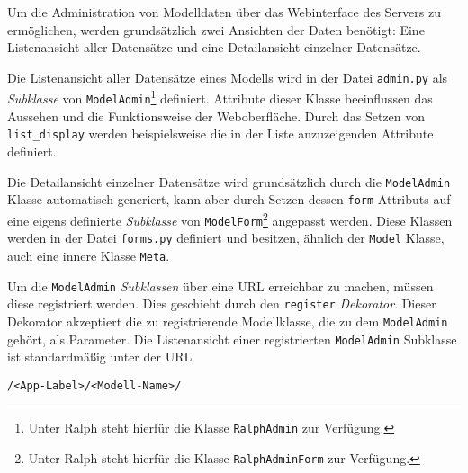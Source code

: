 Um die Administration von Modelldaten über das Webinterface des Servers
zu ermöglichen, werden grundsätzlich zwei Ansichten der Daten benötigt:
Eine Listenansicht aller Datensätze und eine Detailansicht einzelner
Datensätze.

Die Listenansicht aller Datensätze eines Modells wird in der Datei
\texttt{admin.py} als
\emph{Subklasse}
von \texttt{ModelAdmin}\footnote{Unter Ralph steht hierfür die Klasse
  \texttt{RalphAdmin} zur Verfügung.\cite{ralph-admin-doku}} definiert.
Attribute dieser Klasse beeinflussen das Aussehen und die Funktionsweise
der Weboberfläche. Durch das Setzen von \texttt{list\_display} werden
beispielsweise die in der Liste anzuzeigenden Attribute definiert.

Die Detailansicht einzelner Datensätze wird grundsätzlich durch die
\texttt{ModelAdmin} Klasse automatisch generiert, kann aber durch Setzen
dessen \texttt{form} Attributs auf eine eigens definierte
\emph{Subklasse}
von \texttt{ModelForm}\footnote{Unter Ralph steht hierfür die Klasse
  \texttt{RalphAdminForm} zur Verfügung.} angepasst werden. Diese
Klassen werden in der Datei \texttt{forms.py} definiert und besitzen,
ähnlich der \texttt{Model} Klasse, auch eine innere Klasse
\texttt{Meta}.

Um die \texttt{ModelAdmin}
\emph{Subklassen}
über eine URL erreichbar zu machen, müssen diese registriert werden.
Dies geschieht durch den \texttt{register}
\emph{Dekorator}.
Dieser Dekorator akzeptiert die zu registrierende Modellklasse, die zu
dem \texttt{ModelAdmin} gehört, als Parameter. Die Listenansicht einer
registrierten \texttt{ModelAdmin} Subklasse ist standardmäßig unter der
URL

\begin{verbatim}
/<App-Label>/<Modell-Name>/
\end{verbatim}

